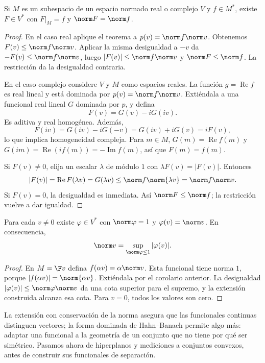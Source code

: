 \begin{corolario}\label{ch21:hb-norma}
Si $M$ es un subespacio de un espacio normado real o complejo $V$ y $f\in M^*$, existe $F\in V^*$ con $F|_M=f$ y $\norm F=\norm f$.
\end{corolario}
\begin{proof}
En el caso real aplique el teorema a $p(v)=\norm f\norm v$. Obtenemos $F(v)\leq\norm f\norm v$. Aplicar la misma desigualdad a $-v$ da $-F(v)\leq\norm f\norm v$, luego $|F(v)|\leq\norm f\norm v$ y $\norm F\leq\norm f$. La restricción da la desigualdad contraria.

En el caso complejo considere $V$ y $M$ como espacios reales. La función $g=\operatorname{Re}f$ es real lineal y está dominada por $p(v)=\norm f\norm v$. Extiéndala a una funcional real lineal $G$ dominada por $p$, y defina
\[
 F(v)=G(v)-iG(iv).
\]
Es aditiva y real homogénea. Además,
\[
 F(iv)=G(iv)-iG(-v)=G(iv)+iG(v)=iF(v),
\]
lo que implica homogeneidad compleja. Para $m\in M$, $G(m)=\operatorname{Re}f(m)$ y $G(im)=\operatorname{Re}(if(m))=-\operatorname{Im}f(m)$, así que $F(m)=f(m)$.

Si $F(v)\ne0$, elija un escalar $\lambda$ de módulo $1$ con $\lambda F(v)=|F(v)|$. Entonces
\[
 |F(v)|=\operatorname{Re}F(\lambda v)=G(\lambda v)
 \leq\norm f\norm{\lambda v}=\norm f\norm v.
\]
Si $F(v)=0$, la desigualdad es inmediata. Así $\norm F\leq\norm f$; la restricción vuelve a dar igualdad.
\end{proof}

\begin{corolario}\label{ch21:funcional-normante}
Para cada $v\ne0$ existe $\varphi\in V^*$ con $\norm\varphi=1$ y $\varphi(v)=\norm v$. En consecuencia,
\[\norm v=\sup_{\norm\varphi\leq1}|\varphi(v)|.\]
\end{corolario}
\begin{proof}
En $M=\F v$ defina $f(\alpha v)=\alpha\norm v$. Esta funcional tiene norma $1$, porque $|f(\alpha v)|=\norm{\alpha v}$. Extiéndala por el corolario anterior. La desigualdad $|\varphi(v)|\leq\norm\varphi\norm v$ da una cota superior para el supremo, y la extensión construida alcanza esa cota. Para $v=0$, todos los valores son cero.
\end{proof}

La extensión con conservación de la norma asegura que las funcionales continuas distinguen vectores; la forma dominada de Hahn--Banach permite algo más: adaptar una funcional a la geometría de un conjunto que no tiene por qué ser simétrico. Pasamos ahora de hiperplanos y mediciones a conjuntos convexos, antes de construir sus funcionales de separación.

